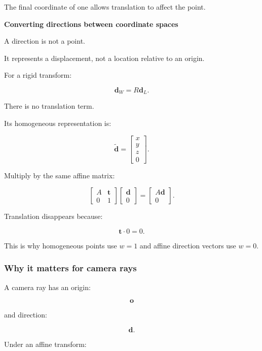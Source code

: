 The final coordinate of one allows translation to affect the point.

\textbf{Converting directions between coordinate spaces}

A direction is not a point.

It represents a displacement, not a location relative to an origin.

For a rigid transform:

\[
 \boxed{ \mathbf d_W=R\mathbf d_L }.
\]

There is no translation term.

Its homogeneous representation is:

\[
 \boxed{ \tilde{\mathbf d}= \begin{bmatrix}x\\y\\z\\0\end{bmatrix} }.
\]

Multiply by the same affine matrix:

\[
 \begin{bmatrix} A&\mathbf t\\ 0&1 \end{bmatrix} \begin{bmatrix} \mathbf d\\0 \end{bmatrix} = \begin{bmatrix} A\mathbf d\\0 \end{bmatrix}.
\]

Translation disappears because:

\[
 \mathbf t\cdot0=0.
\]

This is why homogeneous points use \(w=1\) and affine direction vectors use \(w=0\).

\subsubsection{Why it matters for camera rays}\label{02-foundations-ii-ch032-why-it-matters-for-camera-rays}

\hypertarget{02-foundations-ii-ch032-why-it-matters-for-camera-rays}{}

A camera ray has an origin:

\[
 \mathbf o
\]

and direction:

\[
 \mathbf d.
\]

Under an affine transform:

